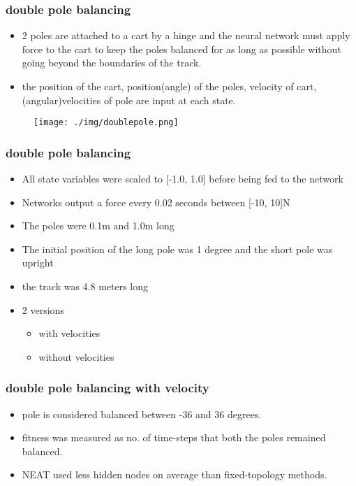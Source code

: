 \documentclass{beamer}
\begin{document}
\begin{frame}
\frametitle{double pole balancing}
\begin{itemize}
\item 2 poles are attached to a cart by a hinge and the neural network must apply force to the cart to keep the poles balanced for as long as possible without going beyond the boundaries of the track.
\item the position of the cart, position(angle) of the poles, velocity of cart, (angular)velocities of pole are input at each state.
\end{itemize}
\begin{figure}
\texttt{[image: ./img/doublepole.png]}
\end{figure}
\end{frame}

\begin{frame}
\frametitle{double pole balancing}
\begin{itemize}
  \item All state variables were scaled to [-1.0, 1.0] before being fed to the network
  \item Networks output a force every 0.02 seconds between [-10, 10]N
  \item The poles were 0.1m and 1.0m long
  \item The initial position of the long pole was 1 degree and the short pole was upright
  \item the track was 4.8 meters long
  \item 2 versions
  \begin{itemize}
    \item with velocities
    \item without velocities
  \end{itemize}
\end{itemize}
\end{frame}

\begin{frame}
\frametitle{double pole balancing with velocity}
\begin{itemize}
  \item pole is considered balanced between -36 and 36 degrees.
  \item fitness was measured as no. of time-steps that both the poles remained balanced.
  \item NEAT used less hidden nodes on average than fixed-topology methods.
\end{itemize}
\end{frame}
\end{document}
